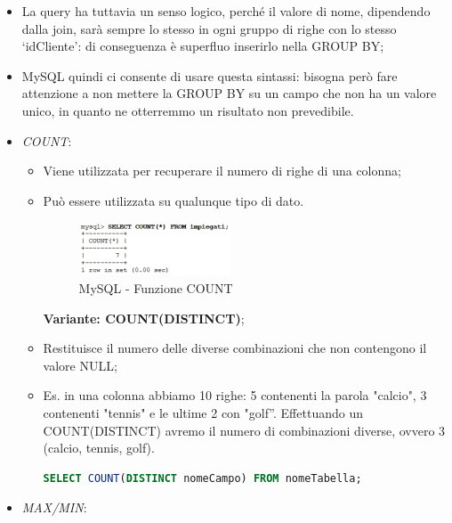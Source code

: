 \begin{itemize}
\item La query ha tuttavia un senso logico, perché il valore di nome, dipendendo dalla join, sarà sempre lo stesso in ogni gruppo di righe con lo stesso ‘idCliente’: di conseguenza è superfluo inserirlo nella GROUP BY;
\item MySQL quindi ci consente di usare questa sintassi: bisogna però fare attenzione a non mettere la GROUP BY su un campo che non ha un valore unico, in quanto ne otterremmo un risultato non prevedibile.

\end{itemize}

\begin{itemize}

\item{\textit{COUNT}}:

\begin{itemize}

\item Viene utilizzata per recuperare il numero di righe di una colonna;
\item Può essere utilizzata su qualunque tipo di dato.

\begin{center}
\begin{figure}[H]
\centering
\includegraphics[scale=1]{figures/mySQL_count.png}
\caption{MySQL - Funzione COUNT} 
\end{figure}
\end{center}

\textbf{Variante: COUNT(DISTINCT)};
\item Restituisce il numero delle diverse combinazioni che non contengono il valore NULL;
\item Es. in una colonna abbiamo 10 righe: 5 contenenti la parola "calcio", 3 contenenti "tennis" e le ultime 2 con "golf”. Effettuando un COUNT(DISTINCT) avremo il numero di combinazioni diverse, ovvero 3 (calcio, tennis, golf).

\begin{lstlisting}[language=SQL] 
SELECT COUNT(DISTINCT nomeCampo) FROM nomeTabella; 
\end{lstlisting}
\end{itemize}


\item{\textit{MAX/MIN}}:


\end{itemize}
